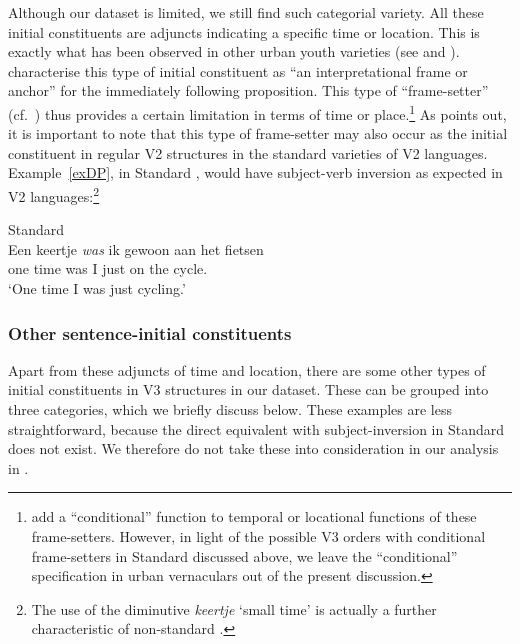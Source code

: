 \documentclass[output=paper]{langsci/langscibook}
\begin{document}
Although our dataset is limited, we still find such categorial variety. All
these initial constituents are adjuncts indicating a specific time or location.
This is exactly what has been observed in other  urban youth varieties
(see \citealt[84]{Freywaldetal:2015} and \citealt{Walkden:2017}).
\citet{Freywaldetal:2015} characterise this type of initial constituent as
\enquote{an interpretational frame or anchor} for the immediately following
proposition.  This type of \enquote{frame-setter} (cf.\ \citealt{Chafe:1976})
thus provides a certain limitation in terms of time or
place.\footnote{\textcite{Freywaldetal:2015} add a \enquote{conditional}
    function to temporal or locational functions of these frame-setters.
    However, in light of the possible V3 orders with
    conditional frame-setters in Standard  discussed above, we leave
    the \enquote{conditional} specification in  urban vernaculars
out of the present discussion.} As \textcite{Walkden:2017} points out, it is
important to note that this type of frame-setter may also occur as the initial
constituent in regular V2 structures in the standard
varieties of  V2 languages.
Example~\eqref{exDP}, in Standard , would have subject-verb inversion
as expected in V2 languages:\footnote{The use of the
diminutive \emph{keertje} `small time' is actually a further characteristic of
non-standard .}

\begin{exe}                   %
\ex Standard \\
\gll\label{exDP}Een keertje \textit{was} ik gewoon aan het fietsen\\
one time was I just on the cycle.\Inf{}\\
\trans \enquote*{One time I was just cycling.}
\end{exe}                   %

\subsubsection{Other sentence-initial constituents}

\noindent Apart from these adjuncts of time and location, there are some other
types of initial constituents in V3 structures in our dataset. These can be
grouped into three categories, which we briefly discuss below. These examples
are less straightforward, because the direct equivalent with subject-inversion
in Standard  does not exist. We therefore do not take these into
consideration in our analysis in .
\end{document}
